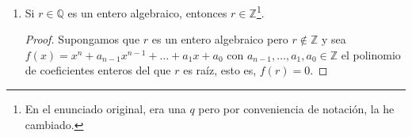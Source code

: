 \documentclass[paper=a4, fontsize=11pt, spanish]{scrartcl}
\begin{document}
\begin{enumerate}
\begin{proof}[Solución]
			$$\left.\begin{aligned}
				(1\ 2)A = B\\
				(1\ 2)B = A
			\end{aligned}\right\} \Rightarrow \phi((1\ 2)) = \begin{pmatrix} 0 & 1\\ 1 & 0 \end{pmatrix}$$
			
			$$\left.\begin{aligned}
				(1\ 3)A = C\\
				(1\ 3)B = B
			\end{aligned}\right\} \Rightarrow \phi((1\ 3)) = \begin{pmatrix} -1 & 0\\ -1 & 1 \end{pmatrix}$$
			
			$$\left.\begin{aligned}
				(2\ 3)A = A\\
				(2\ 3)B = C
			\end{aligned}\right\} \Rightarrow \phi((2\ 3)) = \begin{pmatrix} 1 & -1\\ 0 & -1 \end{pmatrix}$$
			
			$$\left.\begin{aligned}
				(1\ 2\ 3)A = B\\
				(1\ 2\ 3)B = C
			\end{aligned}\right\} \Rightarrow \phi((1\ 2\ 3)) = \begin{pmatrix} 0 & -1\\ 1 & -1 \end{pmatrix}$$
			
			$$\left.\begin{aligned}
				(1\ 3\ 2)A = C\\
				(1\ 3\ 2)B = A
			\end{aligned}\right\} \Rightarrow \phi((1\ 3\ 2)) = \begin{pmatrix} -1 & 1\\ -1 & 0 \end{pmatrix}$$
		\end{proof}
       
		\item Si $r \in \mathbb{Q}$ es un entero algebraico, entonces $r \in \mathbb{Z}$\footnote{En el
		enunciado original, era una $q$ pero por conveniencia de notación, la he cambiado.}.
		\begin{proof}
			Supongamos que $r$ es un entero algebraico pero $r \notin \mathbb{Z}$ y sea $f(x) = x^n +
			a_{n-1}x^{n-1} + \dots + a_1x + a_0$ con $a_{n-1}, \dots, a_1, a_0 \in \mathbb{Z}$ el polinomio de
			coeficientes enteros del que $r$ es raíz, esto es, $f(r) = 0$.
			

\end{proof}
\end{enumerate}
\end{document}
